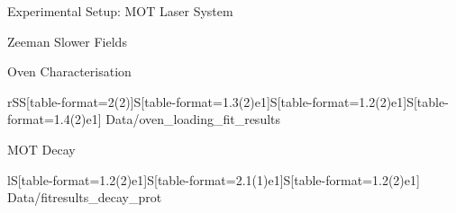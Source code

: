 \appendix

\begin{frame}[t]{Experimental Setup: MOT Laser System}
    \tiny{}
\end{frame}

\begin{frame}[t, plain]
    \tiny{}
\end{frame}

\begin{frame}[t]{Zeeman Slower Fields}
\end{frame}

\begin{frame}[t]{Oven Characterisation}
    \begin{table}[t]
        \footnotesize
        \centering
        \begin{tabular}{rSS[table-format=2(2)]S[table-format=1.3(2)e1]S[table-format=1.2(2)e1]S[table-format=1.4(2)e1]}
            \expandableinput Data/oven_loading_fit_results
        \end{tabular}
    \end{table}
\end{frame}

\begin{frame}[t]{MOT Decay}
    \begin{table}[t]
        \small
        \centering
        \bgroup
        \def\arraystretch{1.2}
        \begin{tabular}{lS[table-format=1.2(2)e1]S[table-format=2.1(1)e1]S[table-format=1.2(2)e1]}
            \expandableinput Data/fitresults_decay_prot
        \end{tabular}
        \egroup
    \end{table}
\end{frame}
